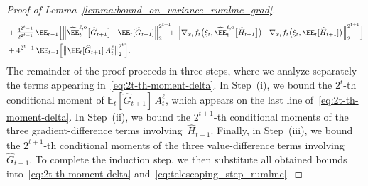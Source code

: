 \documentclass[11pt]{article}
\let\hat\widehat
\begin{document}
\begin{proof}[Proof of Lemma~\ref{lemma:bound_on_variance_rumlmc_grad}]
\begin{equation}
\begin{aligned}
    &+ {\textstyle \frac{4^{2^t-1}}{2^{2^t+1}}} \, \EE_{t-1}\Big[\Big\| \hat\EE_t^{\ell, {\rm o}}\big[\hat{G}_{t+1}\big] \! - \! \EE_t[\hat{G}_{t+1}] \Big\|_{2}^{2^{t+1}} \hspace{-2mm} + \Big\| \nabla_{x_t} f_t \big(\xi_t, \hat\EE_t^{\ell, {\rm o}}\big[\hat{H}_{t+1}\big]\big) \! - \! \nabla_{x_t} f_t\big(\xi_t, \EE_t[\hat{H}_{t+1}] \big)\Big\|_{2}^{2^{t+1}}\Big]\\
    &+4^{2^t-1}\, \EE_{t-1}\Big[\big\|\EE_t[\hat{G}_{t+1}] \, A^\ell_t\big\|_{2}^{2^t}\Big].
 \end{aligned}
\end{equation}
The remainder of the proof proceeds in three steps, where we analyze separately the terms appearing in~\eqref{eq:2t-th-moment-delta}. In Step~(i), we bound the $2^t$-th conditional moment of $\mathbb{E}_t[\hat{G}_{t+1}] \, A_t^\ell$, which appears on the last line of~\eqref{eq:2t-th-moment-delta}. In Step~(ii), we bound the $2^{t+1}$-th conditional moments of the three gradient-difference terms involving~$\hat{H}_{t+1}$. Finally, in Step~(iii), we bound the $2^{t+1}$-th conditional moments of the three value-difference terms involving~$\hat{G}_{t+1}$. To complete the induction step, we then substitute all obtained bounds into~\eqref{eq:2t-th-moment-delta} and~\eqref{eq:telescoping_step_rumlmc}. %


\end{proof}
\end{document}
